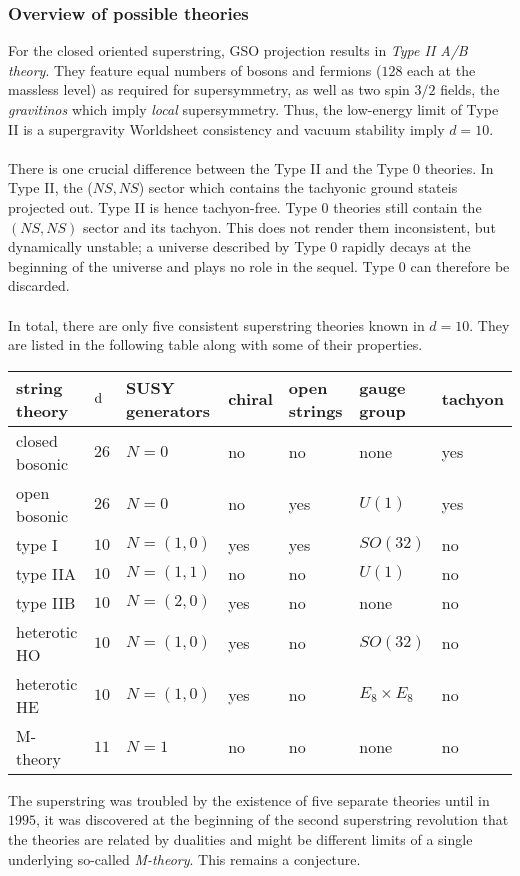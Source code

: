 \subsubsection{Overview of possible theories}
For the closed oriented superstring, GSO projection results in \emph{Type II A/B theory}. They feature equal numbers of bosons and fermions ($128$ each at the massless level) as required for supersymmetry, as well as two spin $3/2$ fields, the \emph{gravitinos} which imply \emph{local} supersymmetry. Thus, the low-energy limit of Type II is a supergravity Worldsheet consistency and vacuum stability imply $d=10$.\\
\\
There is one crucial difference between the Type II and the Type $0$ theories. In Type II, the ($NS,NS$) sector which contains the tachyonic ground stateis projected out. Type II is hence tachyon-free. Type $0$ theories still contain the $(NS,NS)$ sector and its tachyon. This does not render them inconsistent, but dynamically unstable; a universe described by Type $0$ rapidly decays at the beginning of the universe and plays no role in the sequel. Type $0$ can therefore be discarded.
\\
\\
In total, there are only five consistent superstring theories known in $d=10$. They are listed in the following table along with some of their properties.
\bse 
\begin{tabular}{lllllll}
	string theory & $\md$& SUSY generators & chiral & open strings & gauge group & tachyon \\
	\toprule 
	closed bosonic & $26$ & $N=0$ & no & no &none &yes \\
	open bosonic & $26$& $N=0$ & no & yes &$U(1)$&yes \\
	type I & $10$ & $N=(1,0)$ & yes& yes& $SO(32)$ & no \\
	type IIA & $10$ & $N=(1,1)$ & no &no&$U(1)$ & no \\
	type IIB & $10$ & $N=(2,0)$ & yes & no & none & no \\
	heterotic HO & $10$ & $N=(1,0)$ & yes & no & $SO(32)$ & no\\
	heterotic HE & $10$ & $N=(1,0)$ & yes & no &$E_8 \times E_8$ & no \\
	M-theory & $11$ & $N=1$ & no & no & none & no \\	 
	\bottomrule
\end{tabular}
\ese 
The superstring was troubled by the existence of five separate theories until in $1995$, it was discovered at the beginning of the second superstring revolution that the theories are related by dualities and might be different limits of a single underlying so-called \emph{M-theory}. This remains a conjecture.



